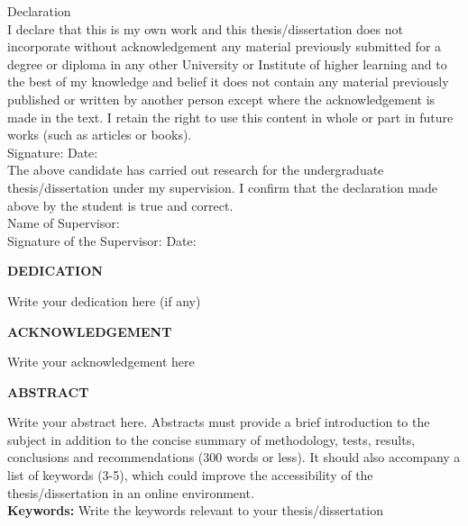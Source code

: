 \documentclass[12pt, a4paper]{report}
\begin{document}
\clearpage
{}
\vspace*{0.5in}
\noindent Declaration\\[0.2in]
I declare that this is my own work and this thesis/dissertation does not incorporate without acknowledgement any material previously submitted for a degree or diploma in any other University or Institute of higher learning and to the best of my knowledge and belief it does not contain any material previously published or written by another person except where the acknowledgement is made in the text. I retain the right to use this content in whole or part in future works (such as articles or books).\\[1in]

\noindent Signature: \hfill Date:\\[1in]

\noindent The above candidate has carried out research for the undergraduate thesis/dissertation under my supervision. I confirm that the declaration made above by the student is true and correct.\\[1in]

\noindent Name of Supervisor:\\[0.5in]
\noindent Signature of the Supervisor: \hfill Date:

\clearpage
{}
\begin{center}
    \textbf{DEDICATION}
\end{center}
\vspace{0.3in}
\noindent Write your dedication here (if any)

\clearpage
{}
\begin{center}
    \textbf{ACKNOWLEDGEMENT}
\end{center}
\vspace{0.3in}
\noindent Write your acknowledgement here

\clearpage
{}
\begin{center}
    \textbf{ABSTRACT}
\end{center}
\vspace{0.3in}
\noindent Write your abstract here. Abstracts must provide a brief introduction to the subject in addition to the concise summary of methodology, tests, results, conclusions and recommendations (300 words or less). It should also accompany a list of keywords (3-5), which could improve the accessibility of the thesis/dissertation in an online environment.\\[0.3in]
\textbf{Keywords:} Write the keywords relevant to your thesis/dissertation
\end{document}

